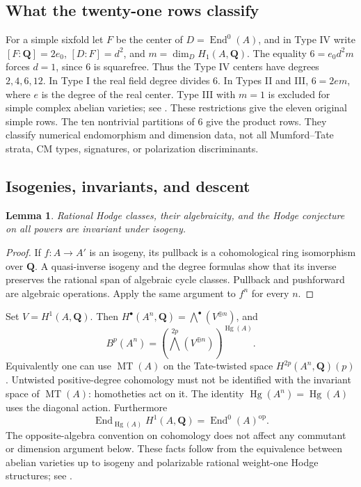 \documentclass[10pt,reqno]{article}
\theoremstyle{emphasizedplain}
\theoremstyle{emphasizeddefinition}
\theoremstyle{emphasizeddefinition}
\newtheorem{prelemma}{Lemma}
\DeclareMathOperator{\End}{End}
\DeclareMathOperator{\Hg}{Hg}
\DeclareMathOperator{\MT}{MT}
\newcommand{\Q}{\mathbf Q}
\newcommand{\B}{B}
\begin{document}
\subsection*{What the twenty-one rows classify}
For a simple sixfold let $F$ be the center of $D=\End^0(A)$, and in Type IV
write $[F:\Q]=2e_0$, $[D:F]=d^2$, and $m=\dim_D H_1(A,\Q)$.
The equality $6=e_0d^2m$ forces $d=1$, since $6$ is squarefree.
Thus the Type IV centers have degrees $2,4,6,12$. In Type I the real field
degree divides $6$. In Types II and III, $6=2em$, where $e$ is the degree of
the real center. Type III with $m=1$ is excluded for simple complex abelian
varieties; see \cite[\S3.2]{Vial}. These restrictions give the eleven original
simple rows. The ten nontrivial partitions of $6$ give the product rows.
They classify numerical endomorphism and dimension data, not all
Mumford--Tate strata, CM types, signatures, or polarization discriminants.

\subsection*{Isogenies, invariants, and descent}
\begin{prelemma}\label{p:isogeny}
Rational Hodge classes, their algebraicity, and the Hodge conjecture on all
powers are invariant under isogeny.
\end{prelemma}
\begin{proof}
If $f:A\to A'$ is an isogeny, its pullback is a cohomological ring
isomorphism over $\Q$. A quasi-inverse isogeny and the degree formulas show
that its inverse preserves the rational span of algebraic cycle classes.
Pullback and pushforward are algebraic operations. Apply the same argument
to $f^n$ for every $n$.
\end{proof}
Set $V=H^1(A,\Q)$. Then $H^\bullet(A^n,\Q)=\bigwedge^\bullet(V^{\oplus n})$,
and
\[
 \B^p(A^n)=\left(\bigwedge^{2p}(V^{\oplus n})\right)^{\Hg(A)}.
\]
Equivalently one can use $\MT(A)$ on the Tate-twisted space
$H^{2p}(A^n,\Q)(p)$. Untwisted positive-degree cohomology must not be
identified with the invariant space of $\MT(A)$: homotheties act on it.
The identity $\Hg(A^n)=\Hg(A)$ uses the diagonal action.
Furthermore
\[
 \End_{\Hg(A)}H^1(A,\Q)=\End^0(A)^{\mathrm{op}}.
\]
The opposite-algebra convention on cohomology does not affect any commutant
or dimension argument below. These facts follow from the equivalence between
abelian varieties up to isogeny and polarizable rational weight-one Hodge
structures; see \cite[\S\S1--2]{Moonen}.
\end{document}
